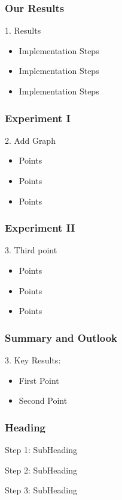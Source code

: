 \documentclass{beamer}
\begin{document}
\begin{frame}
\frametitle{Our Results}

1. Results

\begin{itemize}
\item  Implementation Steps
\item  Implementation Steps
\item  Implementation Steps
\end{itemize}
\end{frame}


\begin{frame}
\frametitle{Experiment I }

2. Add Graph

\begin{itemize}
\item  Points
\item Points
\item Points
\end{itemize}
\end{frame}


\begin{frame}
\frametitle{Experiment II}

3. Third point 
\begin{itemize}
\item  Points
\item Points
\item Points
\end{itemize}
\end{frame}


\begin{frame}
\frametitle{Summary and Outlook }

3. Key Results:
\begin{itemize}
\item First Point
\item Second Point
\end{itemize}
\end{frame}


\begin{frame}
\frametitle{Heading }
\begin{block}{Step 1: SubHeading }

\end{block}

\begin{block}{Step 2: SubHeading}

\end{block}

\begin{block}{Step 3: SubHeading}

\end{block}
\end{frame}
\end{document}
